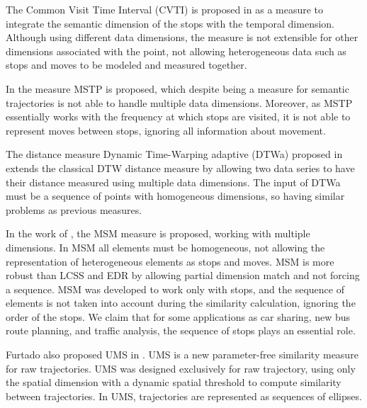 \documentclass[12pt]{article}
\begin{document}
The Common Visit Time Interval (CVTI) is proposed in \cite{Kang:2009:SMT:1529282.1529580} as a measure to integrate the semantic dimension of the stops with the temporal dimension. Although using different data dimensions, the measure is not extensible for other dimensions associated with the point, not allowing heterogeneous data such as stops and moves to be modeled and measured together.

In \cite{Ying:2010:MUS:1867699.1867703} the measure MSTP is proposed, which despite being a measure for semantic trajectories is not able to handle multiple data dimensions. Moreover, as MSTP essentially works with the frequency at which stops are visited, it is not able to represent moves between stops, ignoring all information about movement.

The distance measure Dynamic Time-Warping adaptive (DTWa) proposed in \cite{Shokoohi-Yekta2017} extends the classical DTW \cite{berndt1994using} distance measure by allowing two data series to have their distance measured using multiple data dimensions. The input of DTWa must be a sequence of points with homogeneous dimensions, so having similar problems as previous measures.

In the work of \cite{Furtado:TGIS12156}, the MSM measure is proposed, working with multiple dimensions. In MSM all elements must be homogeneous, not allowing the representation of heterogeneous elements as stops and moves. MSM is more robust than LCSS and EDR by allowing partial dimension match and not forcing a sequence. MSM was developed to work only with stops, and the sequence of elements is not taken into account during the similarity calculation, ignoring the order of the stops. We claim that for some applications as car sharing, new bus route planning, and traffic analysis, the sequence of stops plays an essential role.

Furtado also proposed UMS in \cite{Furtado-UMS-2018}. UMS is a new parameter-free similarity measure for raw trajectories. UMS was designed exclusively for raw trajectory, using only the spatial dimension with a dynamic spatial threshold to compute similarity between trajectories. In UMS, trajectories are represented as sequences of ellipses.

\end{document}

